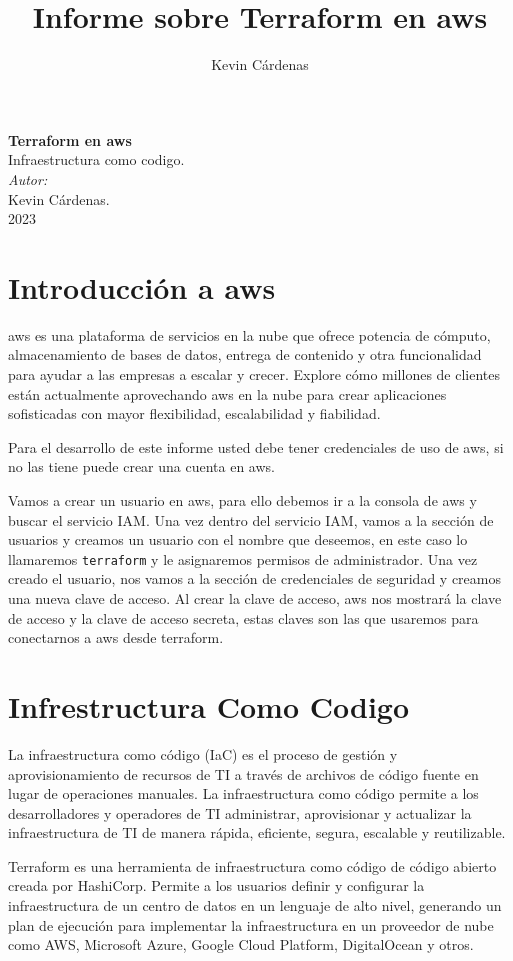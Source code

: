 \documentclass{article}
\title{Informe sobre Terraform en aws}
\author{Kevin Cárdenas}
\begin{document}
\begin{titlepage}
    \begin{center}
        {\Huge \textbf{Terraform en aws}\\
        Infraestructura como codigo.}
        \\[18cm]

        \large\emph{Autor:}\\
        Kevin Cárdenas.
        \\[1cm]
        {\large 2023}
    \end{center}
\end{titlepage}

\newpage
\tableofcontents
\newpage
\section{Introducción a aws}

aws es una plataforma de servicios en la nube que ofrece potencia de cómputo, almacenamiento de bases de datos, entrega de contenido y otra funcionalidad para ayudar a las empresas a escalar y crecer. Explore cómo millones de clientes están actualmente aprovechando aws en la nube para crear aplicaciones sofisticadas con mayor flexibilidad, escalabilidad y fiabilidad.

Para el desarrollo de este informe usted debe tener credenciales de uso de aws, si no las tiene puede crear una cuenta en aws.

Vamos a crear un usuario en aws, para ello debemos ir a la consola de aws y buscar el servicio IAM. Una vez dentro del servicio IAM, vamos a la sección de usuarios y creamos un usuario con el nombre que deseemos, en este caso lo llamaremos \lstinline{terraform} y le asignaremos permisos de administrador. Una vez creado el usuario, nos vamos a la sección de credenciales de seguridad y creamos una nueva clave de acceso. Al crear la clave de acceso, aws nos mostrará la clave de acceso y la clave de acceso secreta, estas claves son las que usaremos para conectarnos a aws desde terraform.



\section{Infrestructura Como Codigo}

La infraestructura como código (IaC) es el proceso de gestión y aprovisionamiento de recursos de TI a través de archivos de código fuente en lugar de operaciones manuales. La infraestructura como código permite a los desarrolladores y operadores de TI administrar, aprovisionar y actualizar la infraestructura de TI de manera rápida, eficiente, segura, escalable y reutilizable.

Terraform es una herramienta de infraestructura como código de código abierto creada por HashiCorp. Permite a los usuarios definir y configurar la infraestructura de un centro de datos en un lenguaje de alto nivel, generando un plan de ejecución para implementar la infraestructura en un proveedor de nube como AWS, Microsoft Azure, Google Cloud Platform, DigitalOcean y otros.
\end{document}
